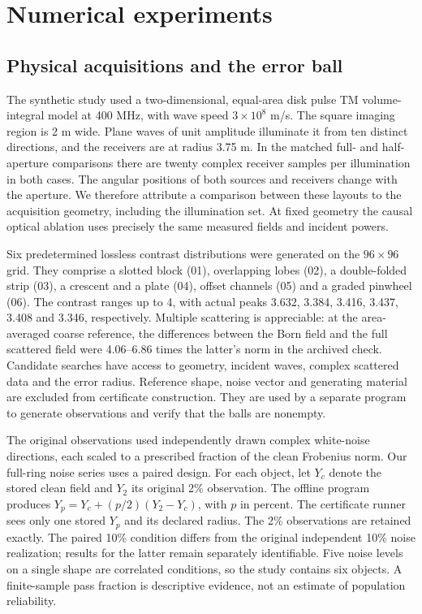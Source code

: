 \documentclass[anonymous,12pt]{iopjournal}
\theoremstyle{remark}\newtheorem{remark}[theorem]{Remark}
\numberwithin{equation}{section}
\begin{document}
\section{Numerical experiments}\label{sec:exp}

\subsection{Physical acquisitions and the error ball}
The synthetic study used a two-dimensional, equal-area disk pulse TM volume-integral model at 400 MHz, with wave speed $3\times10^8$ m/s. The square imaging region is 2 m wide. Plane waves of unit amplitude illuminate it from ten distinct directions, and the receivers are at radius 3.75 m. In the matched full- and half-aperture comparisons there are twenty complex receiver samples per illumination in both cases. The angular positions of both sources and receivers change with the aperture. We therefore attribute a comparison between these layouts to the acquisition geometry, including the illumination set. At fixed geometry the causal optical ablation uses precisely the same measured fields and incident powers.

Six predetermined lossless contrast distributions were generated on the $96\times96$ grid. They comprise a slotted block (01), overlapping lobes (02), a double-folded strip (03), a crescent and a plate (04), offset channels (05) and a graded pinwheel (06). The contrast ranges up to 4, with actual peaks 3.632, 3.384, 3.416, 3.437, 3.408 and 3.346, respectively. Multiple scattering is appreciable: at the area-averaged coarse reference, the differences between the Born field and the full scattered field were 4.06--6.86 times the latter's norm in the archived check. Candidate searches have access to geometry, incident waves, complex scattered data and the error radius. Reference shape, noise vector and generating material are excluded from certificate construction. They are used by a separate program to generate observations and verify that the balls are nonempty.

The original observations used independently drawn complex white-noise directions, each scaled to a prescribed fraction of the clean Frobenius norm. Our full-ring noise series uses a paired design. For each object, let $Y_c$ denote the stored clean field and $Y_2$ its original 2\% observation. The offline program produces $Y_p=Y_c+(p/2)(Y_2-Y_c)$, with $p$ in percent. The certificate runner sees only one stored $Y_p$ and its declared radius. The 2\% observations are retained exactly. The paired 10\% condition differs from the original independent 10\% noise realization; results for the latter remain separately identifiable. Five noise levels on a single shape are correlated conditions, so the study contains six objects. A finite-sample pass fraction is descriptive evidence, not an estimate of population reliability.
\end{document}
